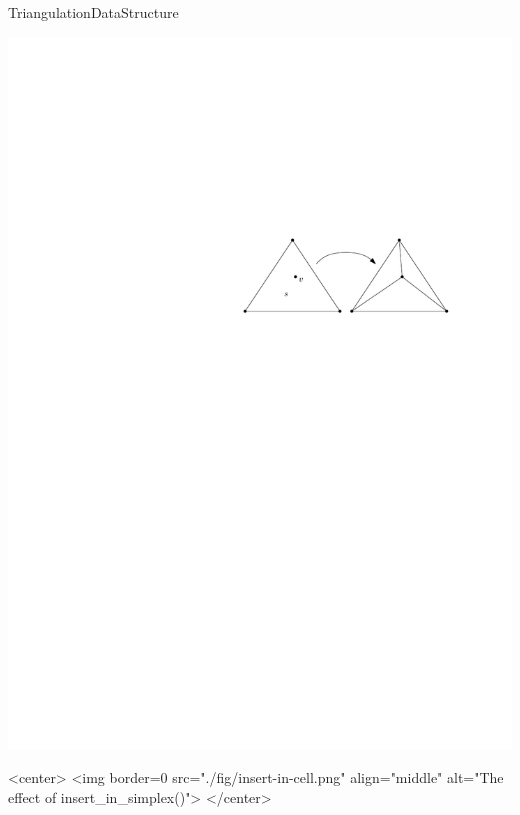 \begin{ccRefConcept}{TriangulationDataStructure}
\begin{ccTexOnly}
\begin{center}
\includegraphics{Triangulation_ref/fig/insert-in-cell.pdf}
\end{center}
\end{ccTexOnly}
\begin{ccHtmlOnly}
<center>
<img border=0 src="./fig/insert-in-cell.png" align="middle" alt="The effect of insert_in_simplex()">
</center>
\end{ccHtmlOnly}


\end{ccRefConcept}

